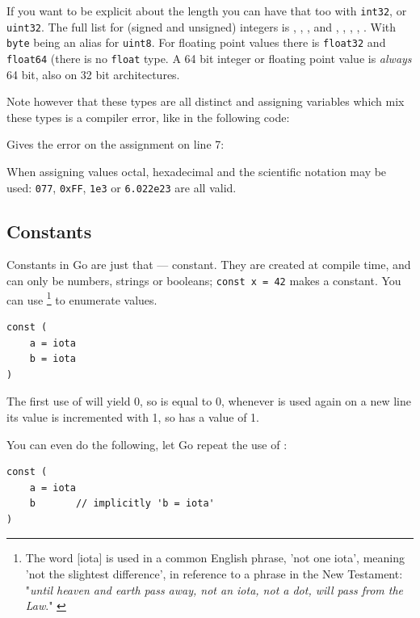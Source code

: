 If you want to be explicit about the length you can have
that too with \lstinline{int32}, or \lstinline{uint32}. The full
list for (signed and unsigned) integers is
, , ,  and
, , , , .
With \lstinline{byte} being an
alias for \lstinline{uint8}. For floating point values there is
\lstinline{float32} and \lstinline{float64} (there is no \lstinline{float} type. 
A 64 bit integer or floating point value is \emph{always} 64 bit, also on 32 bit
architectures.

Note however
that these types are all distinct and assigning variables which mix
these types is a compiler error, like in the following code:

Gives the error on the assignment on line 7:

\noindent{}

When assigning values octal, hexadecimal and the scientific notation may be used: 
\lstinline{077}, \lstinline{0xFF}, \lstinline{1e3} or
\mbox{\lstinline{6.022e23}} are all valid.

\subsection{Constants}
\label{sec:constants}
Constants in Go are just that --- constant. They are created at compile
time, and can only be numbers, strings or booleans;
\lstinline{const x = 42} makes  a constant. You can use
 \footnote{The word [iota] is used in a common English phrase,
'not one iota', meaning 'not the slightest difference', in reference to
a phrase in the New Testament: "\emph{until heaven and earth pass away, not an
iota, not a dot, will pass from the Law}." \cite{iota}}
to enumerate values.
\begin{lstlisting}
const (
	a = iota
	b = iota 
)
\end{lstlisting}
The first use of  will yield 0, so  is equal to 0, whenever
 is used again on a new line its value is incremented with 1, so 
has a value of 1.

You can even do the following, let Go repeat the use of :
\begin{lstlisting}
const (
	a = iota
	b	    // implicitly 'b = iota'
)
\end{lstlisting}

